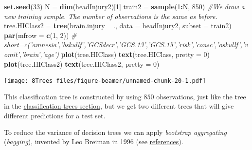 \documentclass[10pt,ignorenonframetext,]{beamer}
\newenvironment{Shaded}{\begin{snugshade}}{\end{snugshade}}
\newcommand{\KeywordTok}[1]{\textcolor[rgb]{0.13,0.29,0.53}{\textbf{#1}}}
\newcommand{\DataTypeTok}[1]{\textcolor[rgb]{0.13,0.29,0.53}{#1}}
\newcommand{\DecValTok}[1]{\textcolor[rgb]{0.00,0.00,0.81}{#1}}
\newcommand{\StringTok}[1]{\textcolor[rgb]{0.31,0.60,0.02}{#1}}
\newcommand{\CommentTok}[1]{\textcolor[rgb]{0.56,0.35,0.01}{\textit{#1}}}
\newcommand{\OperatorTok}[1]{\textcolor[rgb]{0.81,0.36,0.00}{\textbf{#1}}}
\newcommand{\NormalTok}[1]{#1}
\begin{document}
\begin{frame}[fragile]

\begin{Shaded}
\begin{Highlighting}[]
\KeywordTok{set.seed}\NormalTok{(}\DecValTok{33}\NormalTok{)}
\NormalTok{N =}\StringTok{ }\KeywordTok{dim}\NormalTok{(headInjury2)[}\DecValTok{1}\NormalTok{]}
\NormalTok{train2 =}\StringTok{ }\KeywordTok{sample}\NormalTok{(}\DecValTok{1}\OperatorTok{:}\NormalTok{N, }\DecValTok{850}\NormalTok{)  }\CommentTok{#We draw a new training sample. The number of observations is the same as before.}
\NormalTok{tree.HIClass2 =}\StringTok{ }\KeywordTok{tree}\NormalTok{(brain.injury }\OperatorTok{~}\StringTok{ }\NormalTok{., }\DataTypeTok{data =}\NormalTok{ headInjury2, }\DataTypeTok{subset =}\NormalTok{ train2)}
\KeywordTok{par}\NormalTok{(}\DataTypeTok{mfrow =} \KeywordTok{c}\NormalTok{(}\DecValTok{1}\NormalTok{, }\DecValTok{2}\NormalTok{))}
\CommentTok{# short=c('amnesia','bskullf','GCSdecr','GCS.13','GCS.15','risk','consc','oskullf','vomit','brain','age')}
\KeywordTok{plot}\NormalTok{(tree.HIClass)}
\KeywordTok{text}\NormalTok{(tree.HIClass, }\DataTypeTok{pretty =} \DecValTok{0}\NormalTok{)}
\KeywordTok{plot}\NormalTok{(tree.HIClass2)}
\KeywordTok{text}\NormalTok{(tree.HIClass2, }\DataTypeTok{pretty =} \DecValTok{0}\NormalTok{)}
\end{Highlighting}
\end{Shaded}

\texttt{[image: 8Trees\_files/figure-beamer/unnamed-chunk-20-1.pdf]}

\end{frame}

\begin{frame}

This classification tree is constructed by using \(850\) observations,
just like the tree in the \href{classtree2}{classification trees
section}, but we get two different trees that will give different
predictions for a test set.

To reduce the variance of decision trees we can apply \emph{bootstrap
aggregating} (\emph{bagging}), invented by Leo Breiman in 1996 (see
\href{ref}{references}).

\end{frame}
\end{document}
